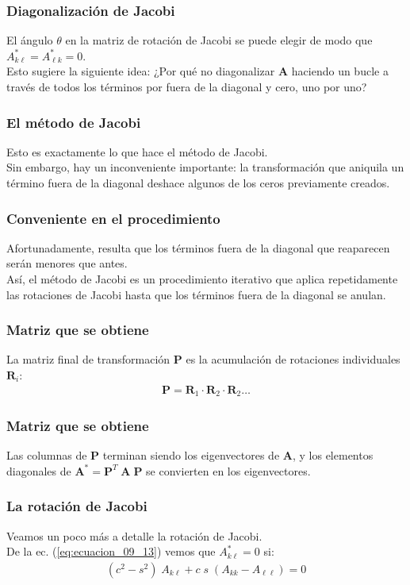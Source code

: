 \documentclass[12pt]{beamer}
\begin{document}
\begin{frame}
\frametitle{Diagonalización de Jacobi}
El ángulo $\theta$ en la matriz de rotación de Jacobi se puede elegir de modo que $A_{k \ell}^{*} = A_{\ell k}^{*} = 0$.
\\
\bigskip
\pause
Esto sugiere la siguiente idea: \pause ¿Por qué no diagonalizar $\mathbf{A}$ haciendo un bucle a través de todos los términos por fuera de la diagonal y cero, uno por uno?
\end{frame}
\begin{frame}
\frametitle{El método de Jacobi}
Esto es exactamente lo que hace el método de Jacobi.
\\
\bigskip
\pause
Sin embargo, hay un inconveniente importante: \pause la transformación que aniquila un término fuera de la diagonal deshace algunos de los ceros previamente creados.
\end{frame}
\begin{frame}
\frametitle{Conveniente en el procedimiento}
Afortunadamente, resulta que los términos fuera de la diagonal que reaparecen serán menores que antes.
\\
\bigskip
\pause
Así, el método de Jacobi es un procedimiento iterativo que aplica repetidamente las rotaciones de Jacobi hasta que los términos fuera de la diagonal se anulan.
\end{frame}
\begin{frame}
\frametitle{Matriz que se obtiene}
La matriz final de transformación $\mathbf{P}$ es la acumulación de rotaciones individuales $\mathbf{R}_{i}$:
\pause
\begin{align}
\mathbf{P} = \mathbf{R}_{1} \cdot \mathbf{R}_{2} \cdot \mathbf{R}_{2} \ldots
\label{eq:ecuacion_09_14}
\end{align}
\end{frame}
\begin{frame}
\frametitle{Matriz que se obtiene}
Las columnas de $\mathbf{P}$ terminan siendo los eigenvectores de $\mathbf{A}$, y los elementos diagonales de $\mathbf{A}^{*} = \mathbf{P}^{T} \; \mathbf{A \; P}$ se convierten en los eigenvectores.
\end{frame}
\begin{frame}
\frametitle{La rotación de Jacobi}
Veamos un poco más a detalle la rotación de Jacobi.
\\
\bigskip
\pause
De la ec. (\ref{eq:ecuacion_09_13}) vemos que $A_{k \ell}^{*} = 0$ si:
\pause
\begin{align}
(c^{2} - s^{2}) \; A_{k \ell} + c \; s \; (A_{k k} - A_{\ell \ell}) = 0
\label{eq:ecuacion_a}
\end{align}
\end{frame}
\end{document}
